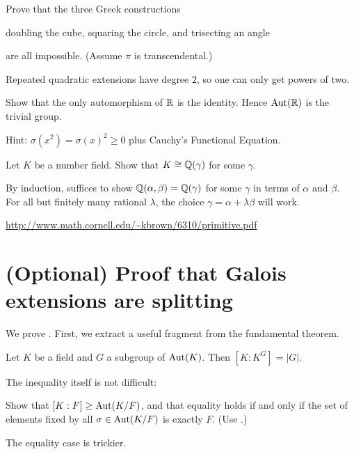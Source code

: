 \begin{problem}
	Prove that the three Greek constructions
	\begin{enumerate}[(a)]
		\ii doubling the cube,
		\ii squaring the circle, and
		\ii trisecting an angle
	\end{enumerate}
	are all impossible.
	(Assume $\pi$ is transcendental.)
	\begin{hint}
		Repeated quadratic extensions have degree $2$, so one can
		only get powers of two.
	\end{hint}
\end{problem}

\begin{problem}
	Show that the only automorphism of $\mathbb R$ is the identity.
	Hence $\operatorname{Aut}(\mathbb R)$ is the trivial group.
	\begin{hint}
		Hint: $\sigma(x^2) = \sigma(x)^2 \ge 0$ plus Cauchy's Functional Equation.
	\end{hint}
\end{problem}

\begin{problem}
	\yod
	Let $K$ be a number field.
	Show that $K \cong \mathbb Q(\gamma)$ for some $\gamma$.
	\label{prob:artin_primitive_elm}
	\begin{hint}
		By induction, suffices to show $\mathbb Q(\alpha, \beta) = \mathbb Q(\gamma)$
		for some $\gamma$ in terms of $\alpha$ and $\beta$.
		For all but finitely many rational $\lambda$,
		the choice $\gamma = \alpha + \lambda \beta$ will work.
	\end{hint}
	\begin{sol}
		\url{http://www.math.cornell.edu/~kbrown/6310/primitive.pdf}
	\end{sol}
\end{problem}

\pagebreak

\section{(Optional) Proof that Galois extensions are splitting}
We prove .
First, we extract a useful fragment from the fundamental theorem.
\begin{theorem}
	\label{thm:fixed_field_theorem}
	Let $K$ be a field and $G$ a subgroup of $\operatorname{Aut}(K)$.
	Then $[K:K^G] = \left\lvert G \right\rvert$.
\end{theorem}

The inequality itself is not difficult:
\begin{exercise}
	Show that $[K:F] \ge \operatorname{Aut}(K/F)$,
	and that equality holds if and only if
	the set of elements fixed by all $\sigma \in \operatorname{Aut}(K/F)$
	is exactly $F$.
	(Use .)
\end{exercise}
The equality case is trickier.

